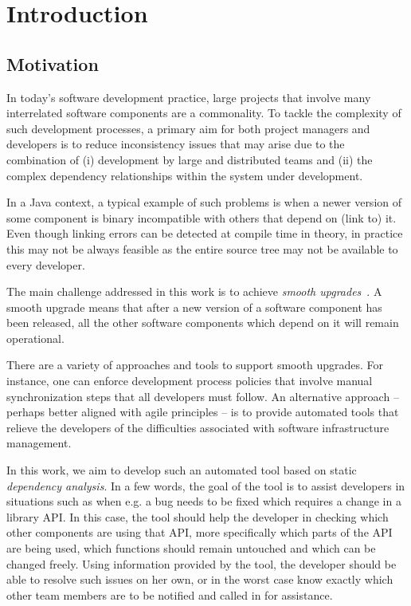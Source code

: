 \chapter{Introduction}

\section{Motivation}

In today's software development practice, large projects that involve many
interrelated software components are a commonality. To tackle the complexity of
such development processes, a primary aim for both project managers and
developers is to reduce inconsistency issues that may arise due to the
combination of (i) development by large and distributed teams and (ii) the
complex dependency relationships within the system under development.

In a Java context, a typical example of such problems is when a newer version of
some component is binary incompatible with others that depend on (link to) it.
Even though linking errors can be detected at compile time in theory, in
practice this may not be always feasible as the entire source tree may not be
available to every developer.

The main challenge addressed in this work is to achieve \emph{smooth
upgrades}~\cite{Ical11}.
A smooth upgrade means that after a new version of a software component has been
released, all the other software components which depend on it will remain
operational.

There are a variety of approaches and tools to support smooth upgrades. For
instance, one can enforce development process policies that involve manual
synchronization steps that all developers must follow. An alternative approach
-- perhaps better aligned with agile principles -- is to provide automated tools
that relieve the developers of the difficulties associated with software
infrastructure management.

In this work, we aim to develop such an automated tool based on static
\emph{dependency analysis}. In a few words, the goal of the tool is to assist
developers in situations such as when e.g. a bug needs to be fixed which
requires a change in a library API.
In this case, the tool should help the developer in checking which other
components are using that API, more specifically which parts of the API are
being used, which functions should remain untouched and which can be changed
freely. Using information provided by the tool, the developer should be able to
resolve such issues on her own, or in the worst case know exactly which other
team members are to be notified and called in for assistance.
 
